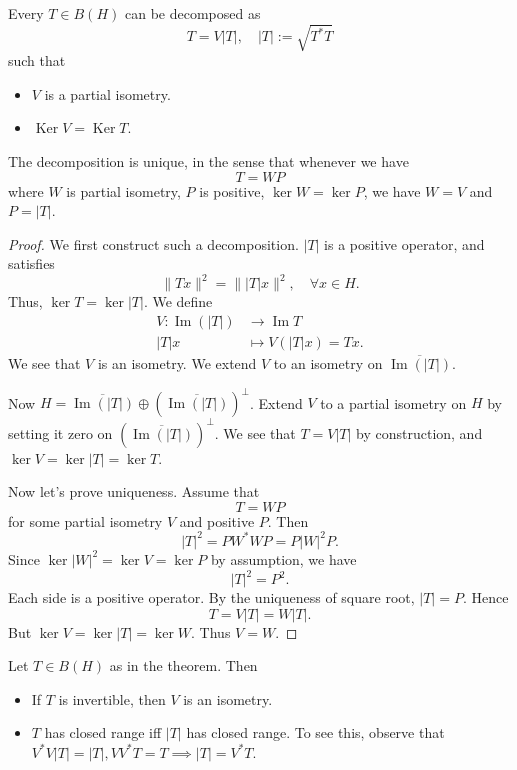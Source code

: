 \begin{theorem}
	\label{thm:PolarDecomposition}
	Every $T \in B(H)$ can be decomposed as
	\[
		T = V |T|, \quad |T| := \sqrt{T^* T} 
	\] 
	such that
	\begin{itemize}
		\item $V$ is a partial isometry.
		\item $\operatorname{Ker} V = \operatorname{Ker} T$.
	\end{itemize}
	The decomposition is unique, in the sense that whenever we have
	\[
		T = W P
	\] 
	where $W$ is partial isometry, $P$ is positive, $\operatorname{ker} W = \operatorname{ker} P$, we have $W = V$ and $P = |T|$.
\end{theorem}
\begin{proof}
	We first construct such a decomposition. $|T|$ is a positive operator, and satisfies
	\[
		\|T x\|^2 = \| |T| x\|^2, \quad \forall  x \in H
	.\] 
	Thus, $\operatorname{ker} T = \operatorname{ker} |T|$. We define
	\begin{align*}
		V: \operatorname{Im} (|T|) &\longrightarrow \operatorname{Im} T \\
		|T|x &\longmapsto V(|T|x) = Tx
	.\end{align*}
	We see that $V$ is an isometry. We extend $V$ to an isometry on $\overline{\operatorname{Im} (|T|)} $. 

	Now $H = \overline{\operatorname{Im} (|T|)} \oplus \left( \overline{\operatorname{Im} (|T|)}  \right) ^\perp$. Extend $V$ to a partial isometry on $H$ by setting it zero on $\left( \overline{\operatorname{Im} (|T|)}  \right) ^\perp$. We see that $T = V |T|$ by construction, and $\operatorname{ker} V = \operatorname{ker} |T| = \operatorname{ker} T$.

	Now let's prove uniqueness. Assume that
	\[
		T = W P
	\] 
	for some partial isometry $V$ and positive $P$. Then
	\[
		|T|^2 = P W^* W P = P |W|^2 P
	.\] 
	Since $\operatorname{ker} |W|^2 = \operatorname{ker} V = \operatorname{ker} P$ by assumption, we have
	\[
		|T|^2 = P^2
	.\] 
	Each side is a positive operator. By the uniqueness of square root, $|T| = P$. Hence
	\[
		T = V |T| = W |T|
	.\] 
	But $\operatorname{ker} V = \operatorname{ker} |T| = \operatorname{ker} W$. Thus $V  = W$.
\end{proof}

\begin{remark}
	Let $T \in B(H)$ as in the theorem. Then
	\begin{itemize}
		\item 
	If $T$ is invertible, then $V$ is an isometry.

	\item
	$T$ has closed range iff $|T|$ has closed range. To see this, observe that $V^* V |T| = |T|, VV^* T = T \implies |T| = V^* T$.
	\end{itemize}
\end{remark}

